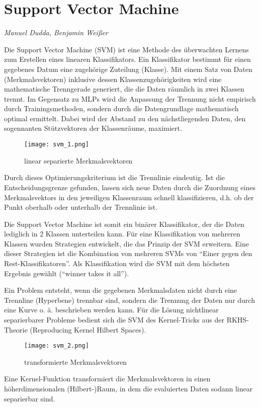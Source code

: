 \section{Support Vector Machine}
\textit{Manuel Dudda, Benjamin Weißer}

Die Support Vector Machine (SVM) ist eine Methode des überwachten Lernens zum Erstellen eines linearen Klassifikators. Ein Klassifikator bestimmt für einen gegebenes Datum eine zugehörige Zuteilung (Klasse). Mit einem Satz von Daten (Merkmalsvektoren) inklusive dessen Klassenzugehörigkeiten wird eine mathematische Trenngerade generiert, die die Daten räumlich in zwei Klassen trennt. Im Gegensatz zu MLPs wird die Anpassung der Trennung nicht empirisch durch Trainingsmethoden, sondern durch die Datengrundlage mathematisch optimal ermittelt. Dabei wird der Abstand zu den nächstliegenden Daten, den sogennanten Stützvektoren der Klassenräume, maximiert.

\begin{wrapfigure}{r}{0.4\textwidth}
	\vspace{-30pt}
	\begin{center}
		 \texttt{[image: svm\_1.png]}
	\end{center}
	\vspace{-15pt}
	\caption{linear separierte Merkmalsvektoren}
	\vspace{-15pt} 
\end{wrapfigure}

Durch dieses Optimierungskriterium ist die Trennlinie eindeutig. Ist die Entscheidungsgrenze gefunden, lassen sich neue Daten durch die Zuordnung eines Merkmalsvektors in den jeweiligen Klassenraum schnell klassifizieren, d.h. ob der Punkt oberhalb oder unterhalb der Trennlinie ist.

Die Support Vector Machine ist somit ein binärer Klassifikator, der die Daten lediglich in 2 Klassen unterteilen kann. Für eine Klassifikation von mehreren Klassen wurden Strategien entwickelt, die das Prinzip der SVM erweitern. Eine dieser Strategien ist die Kombination von mehreren SVMs von “Einer gegen den Rest-Klassifikatoren”. Als Klassifikation wird die SVM mit dem höchsten Ergebnis gewählt (“winner takes it all”).

Ein Problem entsteht, wenn die gegebenen Merkmalsdaten nicht durch eine Trennline (Hyperbene) trennbar sind, sondern die Trennung der Daten nur durch eine Kurve o. ä. beschrieben werden kann. Für die Lösung nichtlinear separierbarer Probleme bedient sich die SVM des Kernel-Tricks aus der RKHS-Theorie (Reproducing Kernel Hilbert Spaces). 
\begin{wrapfigure}{l}{0.45\textwidth}
	\vspace{-30pt}
	\begin{center}
	    \texttt{[image: svm\_2.png]}
	\end{center}
	\vspace{-15pt}
	\caption{transformierte Merkmalsvektoren}
		\vspace{-65pt}
\end{wrapfigure}
Eine Kernel-Funktion transformiert die Merkmalsvektoren in einen höherdimensionalen (Hilbert-)Raum, in dem die evaluierten Daten sodann linear separierbar sind.


